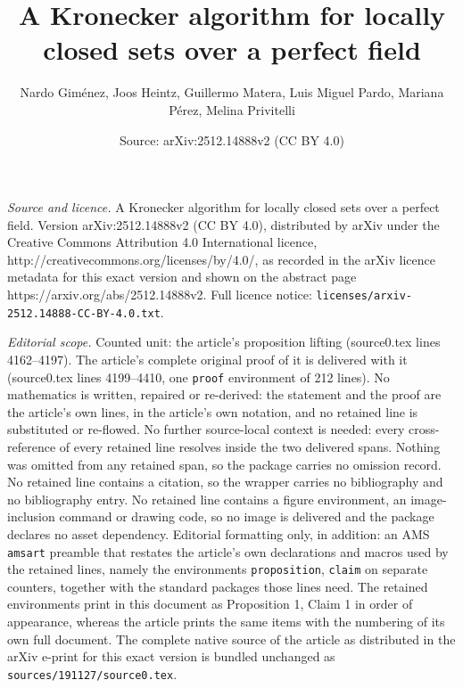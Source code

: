 \documentclass[10pt,a4paper]{amsart}
\title{A Kronecker algorithm for locally closed sets over a perfect field}
\author{Nardo Gim\'enez, Joos Heintz, Guillermo Matera, Luis Miguel Pardo, Mariana P\'erez, Melina Privitelli}
\date{Source: arXiv:2512.14888v2 (CC BY 4.0)}
\begin{document}
\maketitle

\noindent\emph{Source and licence.} A Kronecker algorithm for locally closed sets over a perfect field. Version arXiv:2512.14888v2 (CC BY 4.0), distributed by arXiv under the Creative Commons Attribution 4.0 International licence, http://creativecommons.org/licenses/by/4.0/, as recorded in the arXiv licence metadata for this exact version and shown on the abstract page https://arxiv.org/abs/2512.14888v2. Full licence notice: \texttt{licenses/arxiv-2512.14888-CC-BY-4.0.txt}.\par\smallskip

\noindent\textit{Editorial scope.} Counted unit: the article's proposition lifting (source0.tex lines 4162--4197). The article's complete original proof of it is delivered with it (source0.tex lines 4199--4410, one \texttt{proof} environment of 212 lines). No mathematics is written, repaired or re-derived: the statement and the proof are the article's own lines, in the article's own notation, and no retained line is substituted or re-flowed.  No further source-local context is needed: every cross-reference of every retained line resolves inside the two delivered spans.  Nothing was omitted from any retained span, so the package carries no omission record.  No retained line contains a citation, so the wrapper carries no bibliography and no bibliography entry.  No retained line contains a figure environment, an image-inclusion command or drawing code, so no image is delivered and the package declares no asset dependency.  Editorial formatting only, in addition: an AMS \texttt{amsart} preamble that restates the article's own declarations and macros used by the retained lines, namely the environments \texttt{proposition}, \texttt{claim} on separate counters, together with the standard packages those lines need.  The retained environments print in this document as Proposition 1, Claim 1 in order of appearance, whereas the article prints the same items with the numbering of its own full document.  The complete native source of the article as distributed in the arXiv e-print for this exact version is bundled unchanged as \texttt{sources/191127/source0.tex}.
\end{document}
